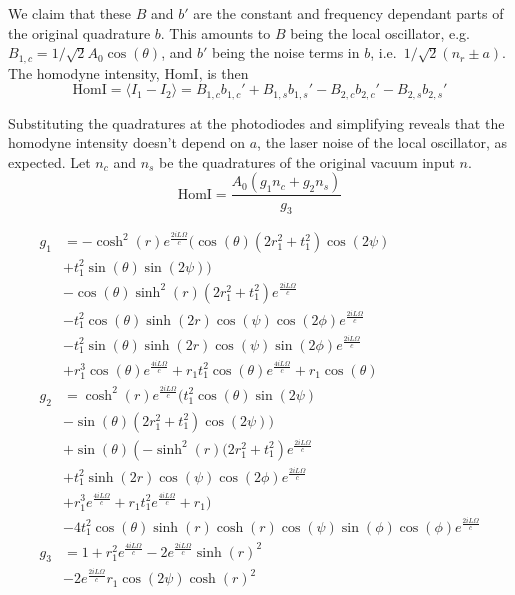 \documentclass[aps,pra,superscriptaddress,reprint,nofootinbib]{revtex4-1}
\newcommand{\expect}[1]{\langle #1 \rangle}
\begin{document}
We claim that these $B$ and $b'$ are the constant and frequency dependant parts of the original quadrature $b$. This amounts to $B$ being the local oscillator, e.g.\ $B_{1,c} = 1/\sqrt{2} A_0 \cos(\theta)$, and $b'$ being the noise terms in $b$, i.e.\ $1/\sqrt{2} (n_r \pm a)$. The homodyne intensity, $\mathrm{HomI}$, is then
$$\mathrm{HomI} = \expect{I_1 - I_2} = B_{1,c} b_{1,c}' + B_{1,s} b_{1,s}' - B_{2,c} b_{2,c}' - B_{2,s} b_{2,s}'$$


Substituting the quadratures at the photodiodes and simplifying reveals that the homodyne intensity doesn’t depend on $a$, the laser noise of the local oscillator, as expected. Let $n_c$ and $n_s$ be the quadratures of the original vacuum input $n$.
$$\mathrm{HomI} = \frac{A_0(g_1 n_c + g_2 n_s)}{g_3}$$

\begingroup
\allowdisplaybreaks
\begin{align*}
g_1 &= -\cosh ^2(r) e^{\frac{2 i L \Omega }{c}} (\cos (\theta ) \left(2 r_1^2+t_1^2\right) \cos (2 \psi )\\
	&+t_1^2	\sin (\theta ) \sin (2 \psi )) \\
	&-\cos (\theta ) \sinh ^2(r) \left(2 r_1^2+t_1^2\right) e^{\frac{2 i L \Omega
	}{c}}\\
	&-t_1^2 \cos (\theta ) \sinh (2 r) \cos (\psi ) \cos (2 \phi ) e^{\frac{2 i L \Omega }{c}}\\
	&-t_1^2 \sin (\theta )
	\sinh (2 r) \cos (\psi ) \sin (2 \phi ) e^{\frac{2 i L \Omega }{c}}\\
	&+r_1^3 \cos (\theta ) e^{\frac{4 i L \Omega
	}{c}}+r_1 t_1^2 \cos (\theta ) e^{\frac{4 i L \Omega }{c}}+r_1 \cos (\theta ) \\
g_2 &= \cosh ^2(r) e^{\frac{2 i L \Omega }{c}} (t_1^2 \cos (\theta ) \sin (2 \psi )\\
	&-\sin (\theta ) \left(2 r_1^2+t_1^2\right) \cos (2 \psi ))\\
	&+\sin (\theta ) \left(-\sinh ^2(r) (2 r_1^2+t_1^2\right)
	e^{\frac{2 i L \Omega }{c}}\\
	&+t_1^2 \sinh (2 r) \cos (\psi ) \cos (2 \phi ) e^{\frac{2 i L \Omega }{c}}\\
	&+r_1^3	e^{\frac{4 i L \Omega }{c}}+r_1 t_1^2 e^{\frac{4 i L \Omega }{c}}+r_1)\\
	&-4 t_1^2 \cos (\theta ) \sinh (r) \cosh (r) \cos (\psi ) \sin (\phi ) \cos (\phi ) e^{\frac{2 i L \Omega }{c}} \\
g_3 &= 1 + r_1^2 e^{\frac{4 i L \Omega}{c}} - 2 e^{\frac{2 i L \Omega}{c}} \sinh(r)^2 \\
	&- 2 e^{\frac{2 i L \Omega}{c}} r_1 \cos(2 \psi) \cosh(r)^2 
\end{align*}
\endgroup
\end{document}
